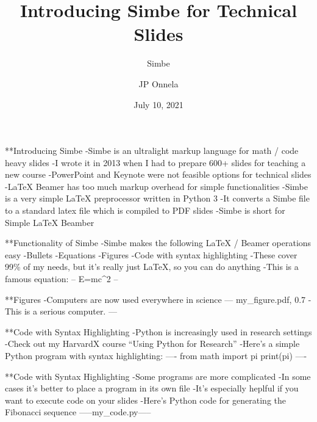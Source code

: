 
\title[Simbe]{Introducing Simbe for Technical Slides}
\subtitle{Simbe}
\author[JP Onnela]{JP Onnela}
\date[July 10, 2021]{July 10, 2021}
\frame{\titlepage}

**Introducing Simbe
-Simbe is an ultralight markup language for math / code heavy slides
-I wrote it in 2013 when I had to prepare 600+ slides for teaching a new course
-PowerPoint and Keynote were not feasible options for technical slides
-LaTeX Beamer has too much markup overhead for simple functionalities
-Simbe is a very simple LaTeX preprocessor written in Python 3
-It converts a Simbe file to a standard latex file which is compiled to PDF slides
-Simbe is short for Simple LaTeX Beamber

**Functionality of Simbe
-Simbe makes the following LaTeX / Beamer operations easy
    -Bullets
    -Equations
    -Figures
    -Code with syntax highlighting
-These cover 99\% of my needs, but it's really just LaTeX, so you can do anything
-This is a famous equation:
--
E=mc^2
--

**Figures
-Computers are now used everywhere in science
---
my_figure.pdf, 0.7
-This is a serious computer.
---

**Code with Syntax Highlighting
-Python is increasingly used in research settings
-Check out my HarvardX course ``Using Python for Research''
-Here's a simple Python program with syntax highlighting:
----
from math import pi
print(pi)
----

**Code with Syntax Highlighting
-Some programs are more complicated
-In some cases it's better to place a program in its own file
-It's especially heplful if you want to execute code on your slides
-Here's Python code for generating the Fibonacci sequence
-----my_code.py-----

